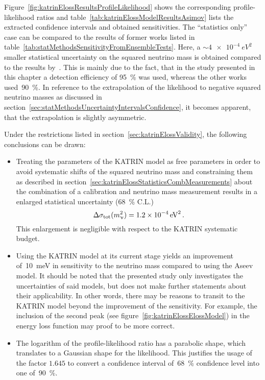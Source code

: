 Figure~\ref{fig:katrinElossResultsProfileLikelihood} shows the corresponding profile-likelihood ratios and table~\ref{tab:katrinElossModelResultsAsimov} lists the extracted confidence intervals and obtained sensitivities. The ``statistics only'' case can be compared to the results of former works listed in table~\ref{tab:statMethodsSensitivityFromEnsembleTests}. Here, a $\sim\SI{4e-4}{eV^2}$ smaller statistical uncertainty on the squared neutrino mass is obtained compared to the results by~\cite{Kleesiek2014, Hoetzel2012}. This is mainly due to the fact, that in the study presented in this chapter a detection efficiency of \SI{95}{\percent} was used, whereas the other works used~\SI{90}{\percent}. In reference to the extrapolation of the likelihood to negative squared neutrino masses as discussed in section~\ref{sec:statMethodsUncertaintyIntervalsConfidence}, it becomes apparent, that the extrapolation is slightly asymmetric.

Under the restrictions listed in section~\ref{sec:katrinElossValidity}, the following conclusions can be drawn:
\begin{itemize}
	\item Treating the parameters of the KATRIN model as free parameters in order to avoid systematic shifts of the squared neutrino mass and constraining them as described in section~\ref{sec:katrinElossStatisticsCombMeasurements} about the combination of a calibration and neutrino mass measurement results in a enlarged statistical uncertainty (\SI{68}{\percent} C.L.)
	\begin{equation*}
		\Delta \sigma_\mathrm{tot}(m_\upnu^2) = \SI{1.2e-4}{eV^2}
		\text{\,.} 
	\end{equation*} 
	This enlargement is negligible with respect to the KATRIN systematic budget.
	\item Using the KATRIN model at its current stage yields an improvement of~\SI{10}{meV} in sensitivity to the neutrino mass compared to using the Aseev model. It should be noted that the presented study only investigates the uncertainties of said models, but does not make further statements about their applicability. In other words, there may be reasons to transit to the KATRIN model beyond the improvement of the sensitivity. For example, the inclusion of the second peak (see figure~\ref{fig:katrinElossElossModel}) in the energy loss function may proof to be more correct.
	\item The logarithm of the profile-likelihood ratio has a parabolic shape, which translates to a Gaussian shape for the likelihood. This justifies the usage of the factor $1.645$ to convert a confidence interval of~\SI{68}{\percent} confidence level into one of~\SI{90}{\percent}.
\end{itemize}

